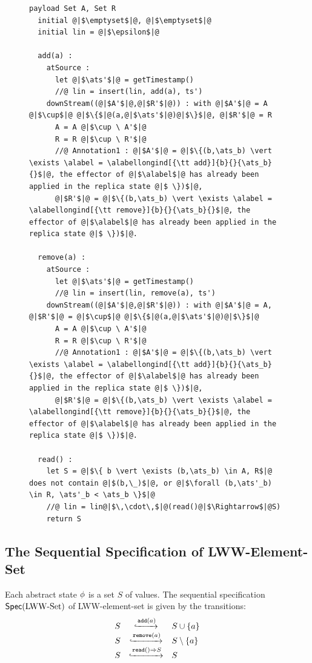 \begin{figure}[t]
\begin{lstlisting}[frame=top,caption={Pseudo-code of LWW-element-set},
captionpos=b,label={lst:LWW-element-set}]
  payload Set A, Set R
  initial @|$\emptyset$|@, @|$\emptyset$|@
  initial lin = @|$\epsilon$|@

  add(a) :
    atSource :
      let @|$\ats'$|@ = getTimestamp()
      //@ lin = insert(lin, add(a), ts')
    downStream((@|$A'$|@,@|$R'$|@)) : with @|$A'$|@ = A @|$\cup$|@ @|$\{$|@(a,@|$\ats'$|@)@|$\}$|@, @|$R'$|@ = R
      A = A @|$\cup \ A'$|@
      R = R @|$\cup \ R'$|@
      //@ Annotation1 : @|$A'$|@ = @|$\{(b,\ats_b) \vert \exists \alabel = \alabellongind[{\tt add}]{b}{}{\ats_b}{}$|@, the effector of @|$\alabel$|@ has already been applied in the replica state @|$ \})$|@,
      @|$R'$|@ = @|$\{(b,\ats_b) \vert \exists \alabel = \alabellongind[{\tt remove}]{b}{}{\ats_b}{}$|@, the effector of @|$\alabel$|@ has already been applied in the replica state @|$ \})$|@.

  remove(a) :
    atSource :
      let @|$\ats'$|@ = getTimestamp()
      //@ lin = insert(lin, remove(a), ts')
    downStream((@|$A'$|@,@|$R'$|@)) : with @|$A'$|@ = A, @|$R'$|@ = @|$\cup$|@ @|$\{$|@(a,@|$\ats'$|@)@|$\}$|@
      A = A @|$\cup \ A'$|@
      R = R @|$\cup \ R'$|@
      //@ Annotation1 : @|$A'$|@ = @|$\{(b,\ats_b) \vert \exists \alabel = \alabellongind[{\tt add}]{b}{}{\ats_b}{}$|@, the effector of @|$\alabel$|@ has already been applied in the replica state @|$ \})$|@,
      @|$R'$|@ = @|$\{(b,\ats_b) \vert \exists \alabel = \alabellongind[{\tt remove}]{b}{}{\ats_b}{}$|@, the effector of @|$\alabel$|@ has already been applied in the replica state @|$ \})$|@.

  read() :
    let S = @|$\{ b \vert \exists (b,\ats_b) \in A, R$|@ does not contain @|$(b,\_)$|@, or @|$\forall (b,\ats'_b) \in R, \ats'_b < \ats_b \}$|@
    //@ lin = lin@|$\,\cdot\,$|@(read()@|$\Rightarrow$|@S)
    return S
\end{lstlisting}
\end{figure}



\subsection{The Sequential Specification of LWW-Element-Set}
\label{subsec:the sequential specification of LWW-element-set}

Each abstract state $\abstate$ is a set $S$ of values. The sequential specification $\specLWWSet$ of LWW-element-set is given by the transitions:
\[
  \begin{array}{rcl}
    S &
               \specarrow{\alabelshort[\mathtt{add}]{a}}
    & S \cup \{ a \} \\
    S &
               \specarrow{\alabelshort[\mathtt{remove}]{a}}
    & S \setminus \{a\} \\
    S
    & \specarrow{\alabellong[\mathtt{read}]{}{ S }{}}
    & S
  \end{array}
\]

